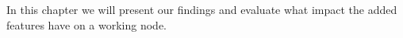 
In this chapter we will present our findings and evaluate what impact the added features have on a working node.
